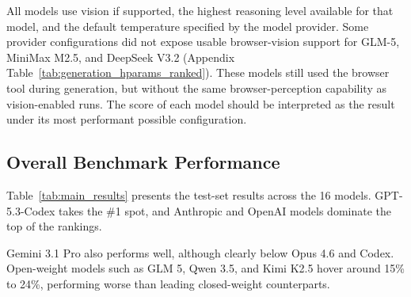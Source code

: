 All models use vision if supported, the highest reasoning level available for that model, and the default temperature specified by the model provider. Some provider configurations did not expose usable browser-vision support for GLM-5, MiniMax M2.5, and DeepSeek V3.2 (Appendix Table~\ref{tab:generation_hparams_ranked}). These models still used the browser tool during generation, but without the same browser-perception capability as vision-enabled runs. The score of each model should be interpreted as the result under its most performant possible configuration.

\subsection{Overall Benchmark Performance}

Table~\ref{tab:main_results} presents the test-set results across the 16 models. GPT-5.3-Codex takes the \#1 spot, and Anthropic and OpenAI models dominate the top of the rankings.

Gemini 3.1 Pro also performs well, although clearly below Opus 4.6 and Codex. Open-weight models such as GLM 5, Qwen 3.5, and Kimi K2.5 hover around 15\% to 24\%, performing worse than leading closed-weight counterparts.


